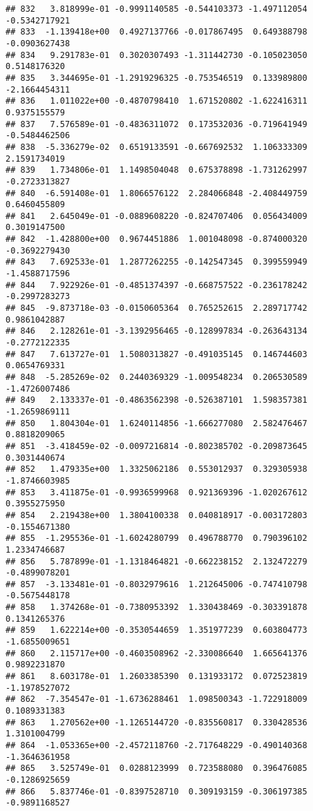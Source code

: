 \documentclass[
]{article}
\begin{document}
\begin{verbatim}
## 832   3.818999e-01 -0.9991140585 -0.544103373 -1.497112054 -0.5342717921
## 833  -1.139418e+00  0.4927137766 -0.017867495  0.649388798 -0.0903627438
## 834   9.291783e-01  0.3020307493 -1.311442730 -0.105023050  0.5148176320
## 835   3.344695e-01 -1.2919296325 -0.753546519  0.133989800 -2.1664454311
## 836   1.011022e+00 -0.4870798410  1.671520802 -1.622416311  0.9375155579
## 837   7.576589e-01 -0.4836311072  0.173532036 -0.719641949 -0.5484462506
## 838  -5.336279e-02  0.6519133591 -0.667692532  1.106333309  2.1591734019
## 839   1.734806e-01  1.1498504048  0.675378898 -1.731262997 -0.2723313827
## 840  -6.591408e-01  1.8066576122  2.284066848 -2.408449759  0.6460455809
## 841   2.645049e-01 -0.0889608220 -0.824707406  0.056434009  0.3019147500
## 842  -1.428800e+00  0.9674451886  1.001048098 -0.874000320 -0.3692279430
## 843   7.692533e-01  1.2877262255 -0.142547345  0.399559949 -1.4588717596
## 844   7.922926e-01 -0.4851374397 -0.668757522 -0.236178242 -0.2997283273
## 845  -9.873718e-03 -0.0150605364  0.765252615  2.289717742  0.9861042887
## 846   2.128261e-01 -3.1392956465 -0.128997834 -0.263643134 -0.2772122335
## 847   7.613727e-01  1.5080313827 -0.491035145  0.146744603  0.0654769331
## 848  -5.285269e-02  0.2440369329 -1.009548234  0.206530589 -1.4726007486
## 849   2.133337e-01 -0.4863562398 -0.526387101  1.598357381 -1.2659869111
## 850   1.804304e-01  1.6240114856 -1.666277080  2.582476467  0.8818209065
## 851  -3.418459e-02 -0.0097216814 -0.802385702 -0.209873645  0.3031440674
## 852   1.479335e+00  1.3325062186  0.553012937  0.329305938 -1.8746603985
## 853   3.411875e-01 -0.9936599968  0.921369396 -1.020267612  0.3955275950
## 854   2.219438e+00  1.3804100338  0.040818917 -0.003172803 -0.1554671380
## 855  -1.295536e-01 -1.6024280799  0.496788770  0.790396102  1.2334746687
## 856   5.787899e-01 -1.1318464821 -0.662238152  2.132472279 -0.4899078201
## 857  -3.133481e-01 -0.8032979616  1.212645006 -0.747410798 -0.5675448178
## 858   1.374268e-01 -0.7380953392  1.330438469 -0.303391878  0.1341265376
## 859   1.622214e+00 -0.3530544659  1.351977239  0.603804773 -1.6855009651
## 860   2.115717e+00 -0.4603508962 -2.330086640  1.665641376  0.9892231870
## 861   8.603178e-01  1.2603385390  0.131933172  0.072523819 -1.1978527072
## 862  -7.354547e-01 -1.6736288461  1.098500343 -1.722918009  0.1089331383
## 863   1.270562e+00 -1.1265144720 -0.835560817  0.330428536  1.3101004799
## 864  -1.053365e+00 -2.4572118760 -2.717648229 -0.490140368 -1.3646361958
## 865   3.525749e-01  0.0288123999  0.723588080  0.396476085 -0.1286925659
## 866   5.837746e-01 -0.8397528710  0.309193159 -0.306197385 -0.9891168527

\end{verbatim}
\end{document}
